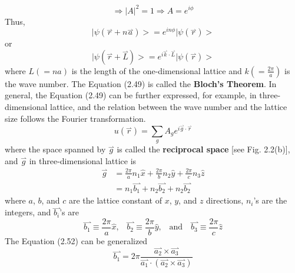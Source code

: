 \begin{equation}
    \Rightarrow \big|A\big|^{2} = 1 \nonumber \Rightarrow A = e^{i\phi}
\end{equation} Thus, \begin{equation}
    \big|\psi\left(\overset{\rightharpoonup}{r}+n\overset{\rightharpoonup}{a}\right)\big> = e^{in\phi}\big|\psi\left(\overset{\rightharpoonup}{r}\right)\big> \nonumber
\end{equation} or \begin{equation}
    \boxed{\big|\psi\left(\overset{\rightharpoonup}{r}+\overset{\rightharpoonup}{L}\right)\big> = e^{i\overset{\rightharpoonup}{k}\cdot\overset{\rightharpoonup}{L}}\big|\psi\left(\overset{\rightharpoonup}{r}\right)\big>}
\end{equation} where $L (= na)$ is the length of the one-dimensional lattice and $k\left(=\frac{2\pi}{a}\right)$ is the wave number. The Equation (2.49) is called the {\bf Bloch's Theorem}. In general, the Equation (2.49) can be further expressed, for example, in three-dimensional lattice, and the relation between the wave number and the lattice size follows the Fourier transformation. \begin{equation}
    u\left(\overset{\rightharpoonup}{r}\right) = \sum_{g}{A_{g}e^{i\overset{\rightharpoonup}{g}\cdot\overset{\rightharpoonup}{r}}}
\end{equation} where the space spanned by $\overset{\rightharpoonup}{g}$ is called the {\bf reciprocal space} [see Fig. 2.2(b)], and $\overset{\rightharpoonup}{g}$ in three-dimensional lattice is \begin{align}
    \overset{\rightharpoonup}{g}& = \frac{2\pi}{a}n_{1}\hat{x} + \frac{2\pi}{b}n_{2}\hat{y} + \frac{2\pi}{c}n_{3}\hat{z}\nonumber\\
    & = n_{1}\overset{\rightharpoonup}{b_{1}} + n_{2}\overset{\rightharpoonup}{b_{2}} + n_{2}\overset{\rightharpoonup}{b_{2}}
\end{align} where $a$, $b$, and $c$ are the lattice constant of $x$, $y$, and $z$ directions, $n_{i}$'s are the integers, and $\overset{\rightharpoonup}{b_{i}}$'s are \begin{equation}
    \overset{\rightharpoonup}{b_{1}} \equiv \frac{2\pi}{a}\hat{x} \text{,} \quad \overset{\rightharpoonup}{b_{2}} \equiv \frac{2\pi}{b}\hat{y} \text{,} \quad \text{and} \quad \overset{\rightharpoonup}{b_{3}} \equiv \frac{2\pi}{c}\hat{z}
\end{equation} The Equation (2.52) can be generalized \begin{equation}
    \overset{\rightharpoonup}{b_{1}} = 2\pi\frac{\overset{\rightharpoonup}{a_{2}}\times\overset{\rightharpoonup}{a_{3}}}{\overset{\rightharpoonup}{a_{1}}\cdot\left(\overset{\rightharpoonup}{a_{2}}\times\overset{\rightharpoonup}{a_{3}}\right)}\nonumber

\end{equation}
